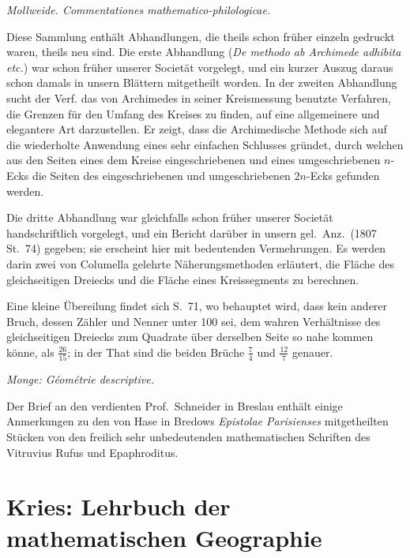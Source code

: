 \documentclass[fontsize=10pt,paper=a5,pagesize,headings=small,headinclude=true,footinclude=true]{scrbook}
\begin{document}
\textit{Mollweide. Commentationes mathematico-philologicae.}

Diese Sammlung enthält Abhandlungen, die theils schon früher einzeln gedruckt waren, theils neu sind. Die erste Abhandlung (\textit{De methodo ab Archimede adhibita etc.}) war schon früher unserer Societät vorgelegt, und ein kurzer Auszug daraus schon damals in unsern Blättern mitgetheilt worden. In der zweiten Abhandlung sucht der Verf. das von Archimedes in seiner Kreismessung benutzte Verfahren, die Grenzen für den Umfang des Kreises zu finden, auf eine allgemeinere und elegantere Art darzustellen. Er zeigt, dass die Archimedische Methode sich auf die wiederholte Anwendung eines sehr einfachen Schlusses gründet, durch welchen aus den Seiten eines dem Kreise eingeschriebenen und eines umgeschriebenen $n$-Ecks die Seiten des eingeschriebenen und umgeschriebenen $2n$-Ecks gefunden werden.

Die dritte Abhandlung war gleichfalls schon früher unserer Societät handschriftlich vorgelegt, und ein Bericht darüber in unsern gel.~Anz.~(1807 St.~74) gegeben; sie erscheint hier mit bedeutenden Vermehrungen. Es werden darin zwei von Columella gelehrte Näherungsmethoden erläutert, die Fläche des gleichseitigen Dreiecks und die Fläche eines Kreissegments zu berechnen.

Eine kleine Übereilung findet sich S.~71, wo behauptet wird, dass kein anderer Bruch, dessen Zähler und Nenner unter 100 sei, dem wahren Verhältnisse des gleichseitigen Dreiecks zum Quadrate über derselben Seite so nahe kommen könne, als $\frac{26}{15}$; in der That sind die beiden Brüche $\frac{7}{4}$ und $\frac{12}{7}$ genauer.

\textit{Monge: Géométrie descriptive.}

Der Brief an den verdienten Prof.~Schneider in Breslau enthält einige Anmerkungen zu den von Hase in Bredows \textit{Epistolae Parisienses} mitgetheilten Stücken von den freilich sehr unbedeutenden mathematischen Schriften des Vitruvius Rufus und Epaphroditus.

\newpage
\section*{Kries: Lehrbuch der mathematischen Geographie}
\end{document}

